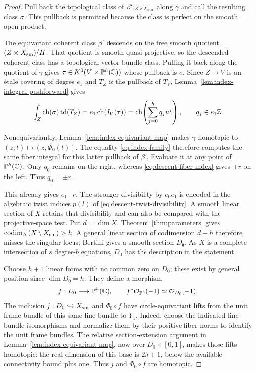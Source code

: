 \begin{proof}
Pull back the topological class of
\(\beta'|_{Z\times X_{\mathrm{sm}}}\) along \(\gamma\) and call the resulting
class \(\sigma\).
This pullback is permitted because the class is perfect on the
smooth open product.

The equivariant coherent class \(\beta'\) descends on the free smooth
quotient \((Z\times X_{\mathrm{sm}})/H\).  That quotient is smooth
quasi-projective, so the descended coherent class has a topological
vector-bundle class.  Pulling it back along the quotient of
\(\gamma\) gives
\(\tau\in K^0(V\times\mathbb P^h(\mathbb C))\) whose pullback is \(\sigma\).
Since \(Z\to V\) is an étale covering of degree \(e_1\) and
\(T_Z\) is the pullback of \(T_V\), Lemma~\ref{lem:index-integral-pushforward}
gives
\begin{equation}\label{eq:index-family}
 \int_Z\operatorname{ch}(\sigma)\operatorname{td}(T_Z)
   =e_1\operatorname{ch}(I_V(\tau))
   =\operatorname{ch}\!\left(\sum_{j=0}^h q_j u^j\right),
 \qquad q_j\in e_1\mathbb Z.
\end{equation}

Nonequivariantly, Lemma~\ref{lem:index-equivariant-map} makes
\(\gamma\) homotopic to \((z,t)\mapsto(z,\Phi_0(t))\).
The equality \eqref{eq:index-family} therefore computes the same
fiber integral for this latter pullback of \(\beta'\).
Evaluate it at any point of \(\mathbb P^h(\mathbb C)\).
Only \(q_0\) remains on the right, whereas
\eqref{eq:descent-fiber-index} gives \(\pm r\) on the left.
Thus \(q_0=\pm r\).

This already gives \(e_1\mid r\).  The stronger divisibility by
\(e_0e_1\) is encoded in the algebraic twist indices \(p(l)\) of
\eqref{eq:descent-twist-divisibility}.  A smooth linear section of \(X\)
retains that divisibility and can also be compared with the
projective-space test.  Put \(d=\dim X\).
Theorem~\ref{thm:parameters} gives
\(\operatorname{codim}_X(X\setminus X_{\mathrm{sm}})>h\).
A general linear section of codimension \(d-h\) therefore misses
the singular locus; Bertini gives a smooth section \(D_0\).
As \(X\) is a complete intersection of \(s\) degree-\(b\) equations,
\(D_0\) has the description in the statement.

Choose \(h+1\) linear forms with no common zero on \(D_0\);
these exist by general position since \(\dim D_0=h\).
They define a morphism
\[
 f:D_0\longrightarrow\mathbb P^h(\mathbb C),
 \qquad f^*\mathcal O_{\mathbb P^h}(-1)\simeq\mathcal O_{D_0}(-1).
\]
The inclusion \(j:D_0\hookrightarrow X_{\mathrm{sm}}\) and
\(\Phi_0\circ f\) have circle-equivariant lifts from the unit frame
bundle of this same line bundle to \(Y_1\).
Indeed, choose the indicated line-bundle isomorphisms and normalize
them by their positive fiber norms to identify the unit frame bundles.
The relative section-extension argument in
Lemma~\ref{lem:index-equivariant-map}, now over
\(D_0\times[0,1]\), makes those lifts homotopic:
the real dimension of this base is \(2h+1\), below the available
connectivity bound plus one.
Thus \(j\) and \(\Phi_0\circ f\) are homotopic.


\end{proof}
